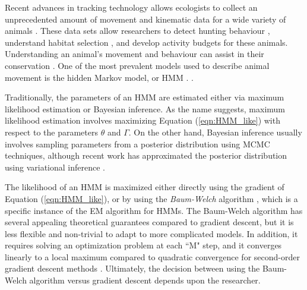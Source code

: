 
Recent advances in tracking technology allows ecologists to collect an unprecedented amount of movement and kinematic data for a wide variety of animals \citep{Patterson:2017}. These data sets allow researchers to detect hunting behaviour \citep{Heerah:2017}, understand habitat selection \citep{Michelot:2019b}, and develop activity budgets \citep{Dot:2016} for these animals. Understanding an animal's movement and behaviour can assist in their conservation \citep{Sutherland:1998}. One of the most prevalent models used to describe animal movement is the hidden Markov model, or HMM \citep{McClintock:2020}. \citep{Sidrow:2021}.

Traditionally, the parameters of an HMM are estimated either via maximum likelihood estimation or Bayesian inference. As the name suggests, maximum likelihood estimation involves maximizing Equation (\ref{eqn:HMM_like}) with respect to the parameters $\theta$ and $\Gamma$. On the other hand, Bayesian inference usually involves sampling parameters from a posterior distribution using MCMC techniques, although recent work has approximated the posterior distribution using variational inference \citep{Foti:2014}.

The likelihood of an HMM is maximized either directly using the gradient of Equation (\ref{eqn:HMM_like}), or by using the \textit{Baum-Welch} algorithm \citep{Baum:1970}, which is a specific instance of the EM algorithm for HMMs. The Baum-Welch algorithm has several appealing theoretical guarantees compared to gradient descent, but it is less flexible and non-trivial to adapt to more complicated models. In addition, it requires solving an optimization problem at each ``M" step, and it converges linearly to a local maximum compared to quadratic convergence for second-order gradient descent methods \citep{Khreich:2012}. Ultimately, the decision between using the Baum-Welch algorithm versus gradient descent depends upon the researcher.


